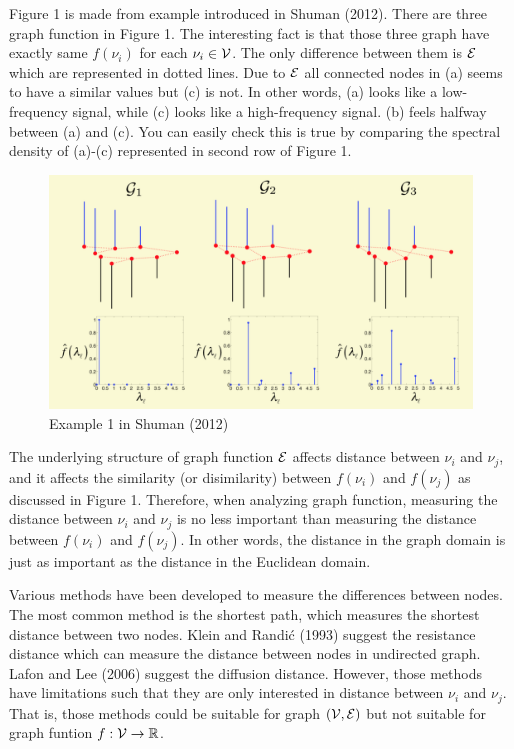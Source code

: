 \documentclass[preprint, review, 12pt]{article}
\theoremstyle{definition}
\theoremstyle{remark}
\begin{document}
Figure 1 is made from example introduced in Shuman (2012). There are three graph function in Figure 1. The interesting fact is that those three graph have exactly same $f(\nu_i)$ for each $\nu_i \in {\cal V}$. The only difference between them is ${\cal E}$ which are represented in dotted lines. Due to ${\cal E}$ all connected nodes in (a) seems to have a similar values but (c) is not. In other words, (a) looks like a low-frequency signal, while (c) looks like a high-frequency signal. (b) feels halfway between (a) and (c). You can easily check this is true by comparing the spectral density of (a)-(c) represented in second row of Figure 1. 

\begin{figure}[htbp]
\centering
\includegraphics[width=1\textwidth]{Fig/Fig1.png} 
\caption{Example 1 in Shuman (2012)}
\end{figure}

The underlying structure of graph function ${\cal E}$ affects distance between $\nu_i$ and $\nu_j$, and it affects the similarity (or disimilarity) between $f(\nu_i)$ and $f(\nu_j)$ as discussed in Figure 1. Therefore, when analyzing graph function, measuring the distance between $\nu_i$ and $\nu_j$ is no less important than measuring the distance between $f(\nu_i)$ and $f(\nu_j)$. In other words, the distance in the graph domain is just as important as the distance in the Euclidean domain.

Various methods have been developed to measure the differences between nodes. The most common method is the shortest path, which measures the shortest distance between two nodes. Klein and Randić (1993) suggest the resistance distance which can measure the distance between nodes in undirected graph. Lafon and Lee (2006) suggest the diffusion distance. However, those methods have limitations such that they are only interested in distance between $\nu_i$ and $\nu_j$. That is, those methods could be suitable for graph $({\cal V},{\cal E})$ but not suitable for graph funtion $f:{\cal V} \to \mathbb{R}$. 
\end{document}
